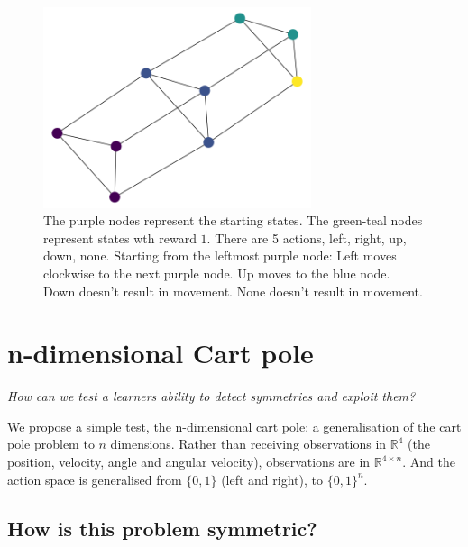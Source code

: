 \begin{figure}[h!]
  \centering
  \includegraphics[width=0.7\textwidth,height=0.35\textheight]{../../pictures/figures/race-mdp-puzzle-n3.png}
  \caption{The purple nodes represent the starting states. The green-teal nodes represent states wth reward $1$. There are 5 actions, left, right, up, down, none.
	Starting from the leftmost purple node: Left moves clockwise to the next purple node. Up moves to the blue node. Down doesn't result in movement. None doesn't result in movement.}
\end{figure}



\section{n-dimensional Cart pole}\label{action-space-experiments}

\begin{displayquote}
  \textit{How can we test a learners ability to detect symmetries and exploit them?}
\end{displayquote}

We propose a simple test, the n-dimensional cart pole: a generalisation of the
cart pole problem to $n$ dimensions. Rather than receiving observations in
$\mathbb{R}^4$ (the position, velocity, angle and angular velocity), observations are
in $\mathbb{R}^{4\times n}$. And the action space is generalised from $\{0,1\}$ (left and right),
to $\{0,1\}^{n}$.


\subsection{How is this problem symmetric?}

